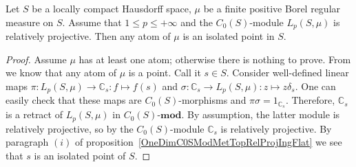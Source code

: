 \begin{proposition}\label{AtomsOfRelProjLpMod} Let $S$ be a locally compact
Hausdorff space, $\mu$ be a finite positive Borel regular measure on $S$. Assume 
that $1\leq p\leq+\infty$ and the $C_0(S)$-module $L_p(S,\mu)$ is relatively 
projective. Then any atom of $\mu$ is an isolated point in $S$.
\end{proposition} 
\begin{proof} Assume $\mu$ has at least one atom; otherwise there is nothing to
prove. From \cite[chapter 5, \S 5, exercise 7]{BourbElemMathIntegLivVI} we
know that any atom of $\mu$ is a point. Call it $s\in S$. Consider well-defined
linear maps $\pi:L_p(S,\mu)\to\mathbb{C}_s:f\mapsto f(s)$ and
$\sigma:\mathbb{C}_s\to L_p(S,\mu):z\mapsto z\delta_s$. One can easily
check that these maps are $C_0(S)$-morphisms and $\pi\sigma=1_{\mathbb{C}_s}$.
Therefore, $\mathbb{C}_s$ is a retract of $L_p(S,\mu)$ in $C_0(S)\text{-}\mathbf{mod}$.
By assumption, the latter module is relatively projective, so by
\cite[proposition 7.1.6]{HelBanLocConvAlg} the $C_0(S)$-module $\mathbb{C}_s$
is relatively projective. By paragraph $(i)$ of
proposition~\ref{OneDimC0SModMetTopRelProjIngFlat} we see that $s$ is an isolated
point of $S$.
\end{proof}

